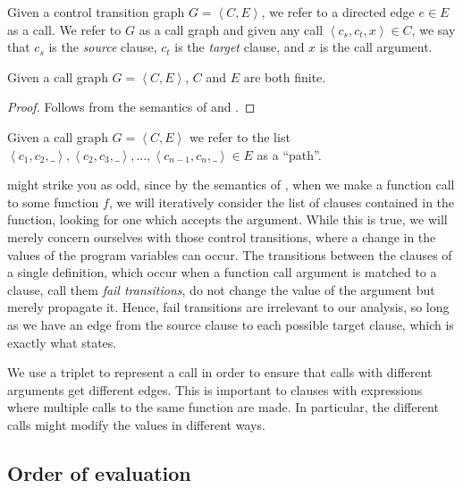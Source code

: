 \begin{definition} Given a control transition graph $G= \left\langle C,E
\right\rangle$, we refer to a directed edge $e\in E$ as a call. We refer to $G$
as a call graph and given any call $\left\langle c_s,c_t,x \right\rangle \in
C$, we say that $c_s$ is the \emph{source} clause, $c_t$ is the \emph{target}
clause, and $x$ is the call argument.  \end{definition}

\begin{lemma}\label{lemma:first-call-graph-finite} Given a call graph $G=
\left\langle C,E \right\rangle$, $C$ and $E$ are both finite.\end{lemma}

\begin{proof} Follows from the semantics of \D{} and
.\end{proof}

\begin{definition} Given a call graph $G = \left\langle C,E \right\rangle$ we
refer to the list $\left\langle c_1,c_2,\_ \right\rangle, \left\langle
c_2,c_3,\_ \right\rangle, \ldots,\left\langle c_{n-1}, c_n,\_ \right\rangle \in
E$ as a ``path''.\end{definition}

 might strike you as odd, since by
the semantics of \D{}, when we make a function call to some function $f$, we
will iteratively consider the list of clauses contained in the function,
looking for one which accepts the argument. While this is true, we will merely
concern ourselves with those control transitions, where a change in the values
of the program variables can occur. The transitions between the clauses of a
single definition, which occur when a function call argument is matched to a
clause, call them \emph{fail transitions}, do not change the value of the
argument but merely propagate it.  Hence, fail transitions are irrelevant to
our analysis, so long as we have an edge from the source clause to each
possible target clause, which is exactly what
 states.

We use a triplet to represent a call in order to ensure that calls with
different arguments get different edges. This is important to clauses with
expressions where multiple calls to the same function are made. In particular,
the different calls might modify the values in different ways.

\subsection{Order of evaluation}

